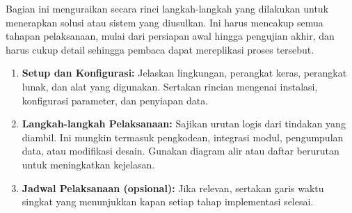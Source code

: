 \documentclass{elsinta}
\begin{document}
Bagian ini menguraikan secara rinci langkah-langkah yang dilakukan untuk menerapkan solusi atau sistem yang diusulkan. Ini harus mencakup semua tahapan pelaksanaan, mulai dari persiapan awal hingga pengujian akhir, dan harus cukup detail sehingga pembaca dapat mereplikasi proses tersebut.
\begin{enumerate}
    \item \textbf{Setup dan Konfigurasi:} Jelaskan lingkungan, perangkat keras, perangkat lunak, dan alat yang digunakan. Sertakan rincian mengenai instalasi, konfigurasi parameter, dan penyiapan data.
    \item \textbf{Langkah-langkah Pelaksanaan:} Sajikan urutan logis dari tindakan yang diambil. Ini mungkin termasuk pengkodean, integrasi modul, pengumpulan data, atau modifikasi desain. Gunakan diagram alir atau daftar berurutan untuk meningkatkan kejelasan.
   
    \item \textbf{Jadwal Pelaksanaan (opsional):} Jika relevan, sertakan garis waktu singkat yang menunjukkan kapan setiap tahap implementasi selesai.
\end{enumerate}

\vspace{0.5cm}

\subsection{\ResultsDiscussionTitle}

\label{sec:results_and_discussion}
\end{document}
